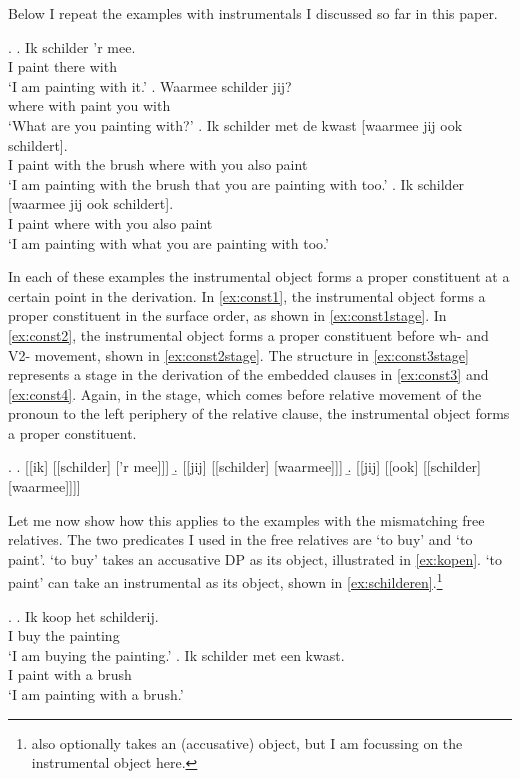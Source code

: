 \documentclass[12pt]{article}
\begin{document}
Below I repeat the examples with instrumentals I discussed so far in this paper.

\ex.
\ag. Ik schilder 'r mee.\\
 I paint there with\\
 `I am painting with it.'\label{ex:const1}
\bg. Waarmee schilder jij?\\
{where with} paint you with\\
 `What are you painting with?'\label{ex:const2}
\bg. Ik schilder met de kwast [waarmee jij ook schildert].\\
 I paint with the brush {where with} you also paint\\
 `I am painting with the brush that you are painting with too.'\label{ex:const3}
\bg. Ik schilder [waarmee jij ook schildert].\\
 I paint {where with} you also paint\\
 `I am painting with what you are painting with too.'\label{ex:const4}

In each of these examples the instrumental object forms a proper constituent at a certain point in the derivation. In \ref{ex:const1}, the instrumental object forms a proper constituent in the surface order, as shown in \ref{ex:const1stage}. In \ref{ex:const2}, the instrumental object forms a proper constituent before wh- and V2- movement, shown in \ref{ex:const2stage}.
The structure in \ref{ex:const3stage} represents a stage in the derivation of the embedded clauses in \ref{ex:const3} and \ref{ex:const4}. Again, in the stage, which comes before relative movement of the pronoun to the left periphery of the relative clause, the instrumental object forms a proper constituent.

\ex.
\a. [[ik] [[schilder] ['r mee]]]\label{ex:const1stage}
\b. [[jij] [[schilder] [waarmee]]]\label{ex:const2stage}
\b. [[jij] [[ook] [[schilder] [waarmee]]]]\label{ex:const3stage}

Let me now show how this applies to the examples with the mismatching free relatives. The two predicates I used in the free relatives are  `to buy' and   `to paint'.  `to buy' takes an accusative DP as its object, illustrated in \ref{ex:kopen}.  `to paint' can take an instrumental as its object, shown in \ref{ex:schilderen}.\footnote{ also optionally takes an (accusative) object, but I am focussing on the instrumental object here.}

\ex.
\ag. Ik koop het schilderij.\\
 I buy the painting\\
 `I am buying the painting.'\label{ex:kopen}
\bg. Ik schilder met een kwast.\\
 I paint with a brush\\
 `I am painting with a brush.'\label{ex:schilderen}
\end{document}
